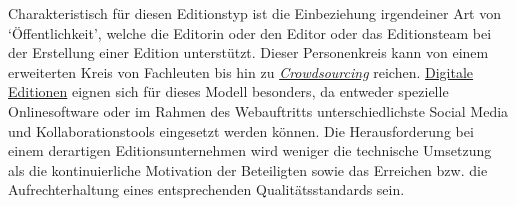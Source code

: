 \documentclass{article}
\begin{document}
    Charakteristisch für diesen Editionstyp ist die Einbeziehung irgendeiner Art von ‘Öffentlichkeit’, welche die Editorin oder den Editor oder das Editionsteam bei der Erstellung einer Edition unterstützt. Dieser Personenkreis kann von einem erweiterten Kreis von Fachleuten bis hin zu \emph{\href{http://gams.uni-graz.at/o:konde.47}{Crowdsourcing}} reichen. \href{http://gams.uni-graz.at/o:konde.59}{Digitale Editionen} eignen sich für dieses Modell besonders, da entweder spezielle Onlinesoftware oder im Rahmen des Webauftritts unterschiedlichste Social Media und Kollaborationstools eingesetzt werden können. Die Herausforderung bei einem derartigen Editionsunternehmen wird weniger die technische Umsetzung als die kontinuierliche Motivation der Beteiligten sowie das Erreichen bzw. die Aufrechterhaltung eines entsprechenden Qualitätsstandards sein. \\
            
\end{document}

